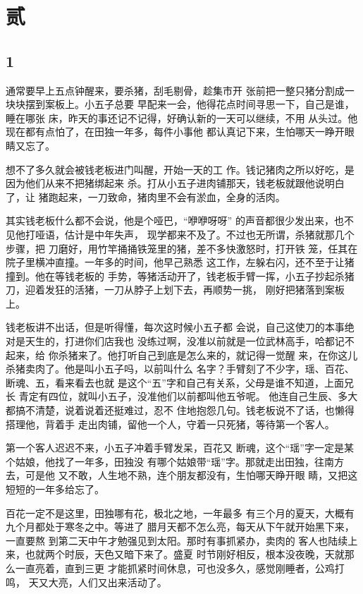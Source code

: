 \section{贰}

{\centering\subsection{1}}

通常要早上五点钟醒来，要杀猪，刮毛剔骨，趁集市开
张前把一整只猪分割成一块块摆到案板上。小五子总要
早配来一会，他得花点时间寻思一下，自己是谁，睡在哪张
床，昨天的事还记不记得，好确认新的一天可以继续，不用
从头过。他现在都有点怕了，在田独一年多，每件小事他
都认真记下来，生怕哪天一睁开眼睛又忘了。

想不了多久就会被钱老板进门叫醒，开始一天的工
作。钱记猪肉之所以好吃，是因为他们从来不把猪绑起来
杀。打从小五子进肉铺那天，钱老板就跟他说明白了，让
猪跑起来，一刀致命，猪肉里不会有淤血，全身的活肉。

其实钱老板什么都不会说，他是个哑巴，“咿咿呀呀”
的声音都很少发出来，也不见他打哑语，估计是中年失声，
现学都来不及了。不过也无所谓，杀猪就那几个步骤，把
刀磨好，用竹竿捅捅铁笼里的猪，差不多快激怒时，打开铁
笼，任其在院子里横冲直撞。一年多的时间，他早己熟悉
这工作，左躲右闪，还不至于让猪撞到。他在等钱老板的
手势，等猪活动开了，钱老板手臂一挥，小五子抄起杀猪
刀，迎着发狂的活猪，一刀从脖子上划下去，再顺势一挑，
刚好把猪落到案板上。

钱老板讲不出话，但是听得懂，每次这时候小五子都
会说，自己这使刀的本事绝对是天生的，打进你们店我也
没练过啊，没准以前就是一位武林高手，哈都记不起来，给
你杀猪来了。他打听自己到底是怎么来的，就记得一觉醒
来，在你这儿杀猪卖肉了。他是叫小五子吗，以前叫什么
名字？手臂刻了不少字，瑶、百花、断魂、五，看来看去也就
是这个“五”字和自己有关系，父母是谁不知道，上面兄长
青定有四位，就叫小五子，没准他们以前都叫他五爷呢。
他连自己生辰、多大都搞不清楚，说着说着还挺难过，忍不
住地抱怨几句。钱老板说不了话，也懒得搭理他，背着手
走出肉铺，留他一个人，守着一只死猪，等待第一个客人。

第一个客人迟迟不来，小五子冲着手臂发呆，百花又
断魂，这个“瑶”字一定是某个姑娘，他找了一年多，田独没
有哪个姑娘带“瑶”字。那就走出田独，往南方去，可是他
又不敢，人生地不熟，连个朋友都没有，生怕哪天睁开眼
睛，又把这短短的一年多给忘了。

百花一定不是这里，田独哪有花，极北之地，一年最多
有三个月的夏天，大概有九个月都处于寒冬之中。等进了
腊月天都不怎么亮，每天从下午就开始黑下来，一直要熬
到第二天中午才勉强见到太阳。那时有事抓紧办，卖肉的
客人也陆续上来，也就两个时辰，天色又暗下来了。盛夏
时节刚好相反，根本没夜晚，天就那么一直亮着，直到三更
才能抓紧时间休息，可也没多久，感觉刚睡者，公鸡打鸣，
天又大亮，人们又出来活动了。

